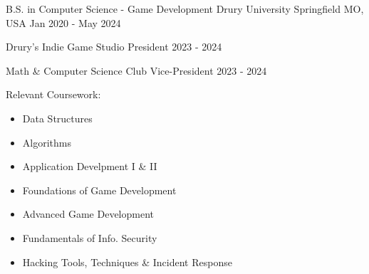 

\begin{cventries}

  \cventry
    {B.S. in Computer Science - Game Development} %
    {Drury University} %
    {Springfield MO, USA} %
    {Jan 2020 - May 2024} %
    {
      \begin{cvitems} %
        \item {Drury's Indie Game Studio President 2023 - 2024}
        \item {Math \& Computer Science Club Vice-President 2023 - 2024}
	\item {Relevant Coursework:}
		\newline
		\begin{itemize}
			\item {Data Structures}
			\item {Algorithms}
			\item {Application Develpment I \& II}
			\item {Foundations of Game Development}
			\item {Advanced Game Development}
			\item {Fundamentals of Info. Security}
			\item {Hacking Tools, Techniques \& Incident Response}
		\end{itemize}
      \end{cvitems}
    }

\end{cventries}
